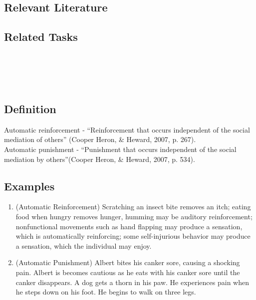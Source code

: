 \subsection{Relevant Literature}
\begin{refsection}
\nocite{test,alang2017police,clayton2018black}
\printbibliography[heading=none]
\end{refsection}
%
\subsection{Related Tasks} 
\fourcThree{}\\
\fourdEighteen{}\\
\fourdNineteen{}\\
%
%
%
%
%
%
\section{\fourFKTwentyThree{}}
\subsection{Definition}
Automatic reinforcement - ``Reinforcement that occurs independent of the social mediation of others'' (Cooper Heron, \& Heward, 2007, p. 267).\\

Automatic punishment - ``Punishment that occurs independent of the social mediation by others''(Cooper Heron, \& Heward, 2007, p. 534).
%
\subsection{Examples}  
\begin{enumerate}
\item (Automatic Reinforcement) Scratching an insect bite removes an itch; eating food when hungry removes hunger, humming may be auditory reinforcement; nonfunctional movements such as hand flapping may produce a sensation, which is automatically reinforcing; some self-injurious behavior may produce a sensation, which the individual may enjoy.
\item (Automatic Punishment) Albert bites his canker sore, causing a shocking pain.  Albert is becomes cautious as he eats with his canker sore until the canker disappears.  A dog gets a thorn in his paw.  He experiences pain when he steps down on his foot.  He begins to walk on three legs. 
\end{enumerate}
%
